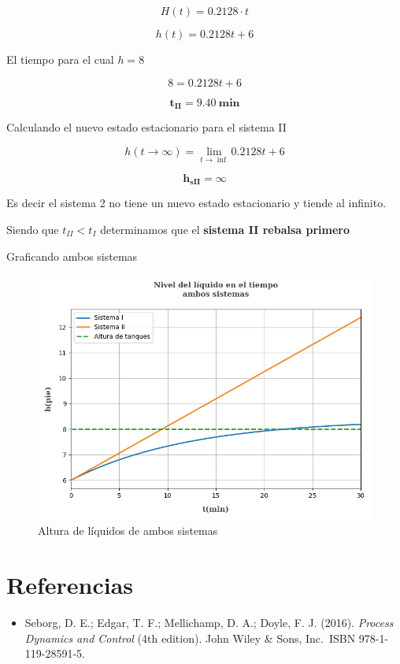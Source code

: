 \documentclass[
  letterpaper,
  DIV=11,
  numbers=noendperiod]{scrreprt}
\providecommand{\tightlist}{%
  \setlength{\itemsep}{0pt}\setlength{\parskip}{0pt}}\usepackage{longtable,booktabs,array}
\begin{document}
\[
H(t)=0.2128\cdot t
\]

\[
h(t)=0.2128t+6
\]

El tiempo para el cual \(h = 8\)

\[
8=0.2128t+6
\]

\[
\mathbf{t_{II}=9.40\ min}
\]

Calculando el nuevo estado estacionario para el sistema II

\[
h(t\to\infty)=\lim_{t\to\inf}0.2128t+6
\]

\[
\mathbf{h_{sII}=\infty}
\]

Es decir el sistema 2 no tiene un nuevo estado estacionario y tiende al
infinito.

Siendo que \(t_{II}<t_I\) determinamos que el \textbf{sistema II rebalsa
primero}

Graficando ambos sistemas

\begin{figure}

{\centering \includegraphics{././images/p5.9-seborg/p59sr.png}

}

\caption{Altura de líquidos de ambos sistemas}

\end{figure}

\hypertarget{referencias-7}{%
\section{Referencias}\label{referencias-7}}

\begin{itemize}
\tightlist
\item
  Seborg, D. E.; Edgar, T. F.; Mellichamp, D. A.; Doyle, F. J. (2016).
  \emph{Process Dynamics and Control} (4th edition). John Wiley \& Sons,
  Inc.~ISBN 978-1-119-28591-5.
\end{itemize}
\end{document}
